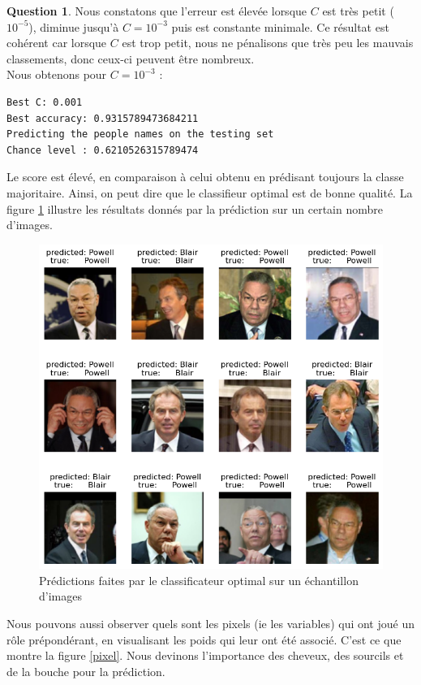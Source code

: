 \documentclass[11pt,a4paper]{article}
\theoremstyle{definition}
\newtheorem{Qu}{Question}
\begin{document}
\begin{Qu}
Nous constatons que l'erreur est élevée lorsque $C$ est très petit ($10^{-5}$), diminue jusqu'à $C=10^{-3}$ puis est constante minimale.
Ce résultat est cohérent car lorsque $C$ est trop petit, nous ne pénalisons que très peu les mauvais classements, donc ceux-ci peuvent être nombreux. \\
Nous obtenons pour $C=10^{-3}$ :  

\begin{verbatim}
Best C: 0.001
Best accuracy: 0.9315789473684211
Predicting the people names on the testing set
Chance level : 0.6210526315789474
\end{verbatim}


Le score est élevé, en comparaison à celui obtenu en prédisant toujours la classe majoritaire. Ainsi, on peut dire que le classifieur optimal est de bonne qualité. La figure \ref{blair} illustre les résultats donnés par la prédiction sur un certain nombre d'images.

 
\begin{figure}[h!]\centering
\includegraphics[width=12cm]{Images/blair.png}
\caption{Prédictions faites par le classificateur optimal sur un échantillon d'images}
\label{blair}
\end{figure}

Nous pouvons aussi observer quels sont les pixels (ie les variables) qui ont joué un rôle prépondérant, en visualisant les poids qui leur ont été associé. C'est ce que montre la figure \ref{pixel}. Nous devinons l'importance des cheveux, des sourcils et de la bouche pour la prédiction.


\end{Qu}
\end{document}
